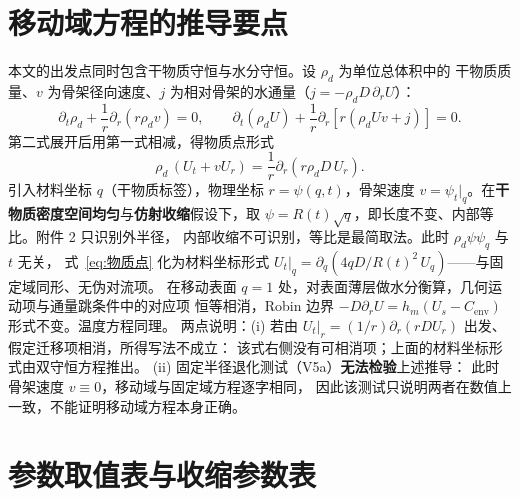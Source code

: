 \documentclass[12pt,a4paper]{ctexart}
\numberwithin{equation}{section}
\begin{document}
\section{移动域方程的推导要点}
本文的出发点同时包含干物质守恒与水分守恒。设 $\rho_d$ 为单位总体积中的
干物质质量、$v$ 为骨架径向速度、$j$ 为相对骨架的水通量（$j=-\rho_d D\,\partial_r U$）：
\begin{equation}
\partial_t\rho_d+\frac1r\partial_r(r\rho_d v)=0,\qquad
\partial_t(\rho_d U)+\frac1r\partial_r\!\left[r(\rho_d Uv+j)\right]=0 .
\end{equation}
第二式展开后用第一式相减，得物质点形式
\begin{equation}
\rho_d\,(U_t+vU_r)=\frac1r\partial_r\!\left(r\rho_d D\,U_r\right).
\label{eq:物质点}
\end{equation}
引入材料坐标 $q$（干物质标签），物理坐标 $r=\psi(q,t)$，骨架速度
$v=\psi_t|_q$。在\textbf{干物质密度空间均匀}与\textbf{仿射收缩}假设下，取
$\psi=R(t)\sqrt q$，即长度不变、内部等比。附件 2 只识别外半径，
内部收缩不可识别，等比是最简取法。此时 $\rho_d\psi\psi_q$ 与 $t$ 无关，
式~\eqref{eq:物质点} 化为材料坐标形式
$U_t|_q=\partial_q\!\left(4qD/R(t)^2\,U_q\right)$——与固定域同形、无伪对流项。
在移动表面 $q=1$ 处，对表面薄层做水分衡算，几何运动项与通量跳条件中的对应项
恒等相消，Robin 边界 $-D\partial_rU=h_m(U_s-C_{\mathrm{env}})$ 形式不变。温度方程同理。
两点说明：(i) 若由 $U_t|_r=(1/r)\partial_r(rDU_r)$ 出发、假定迁移项相消，所得写法不成立：
该式右侧没有可相消项；上面的材料坐标形式由双守恒方程推出。
(ii) 固定半径退化测试（V5a）\textbf{无法检验}上述推导：
此时骨架速度 $v\equiv0$，移动域与固定域方程逐字相同，
因此该测试只说明两者在数值上一致，不能证明移动域方程本身正确。

\section{参数取值表与收缩参数表}
\end{document}
